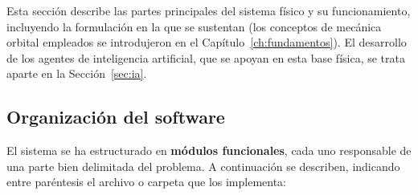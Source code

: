 Esta sección describe las partes principales del sistema físico y su funcionamiento, incluyendo la formulación en la que se sustentan (los conceptos de mecánica orbital empleados se introdujeron en el Capítulo~\ref{ch:fundamentos}). El desarrollo de los agentes de inteligencia artificial, que se apoyan en esta base física, se trata aparte en la Sección~\ref{sec:ia}.

\subsection{Organización del software}
\label{sec:scripts}

El sistema se ha estructurado en \textbf{módulos funcionales}, cada uno responsable de una parte bien delimitada del problema. A continuación se describen, indicando entre paréntesis el archivo o carpeta que los implementa:

